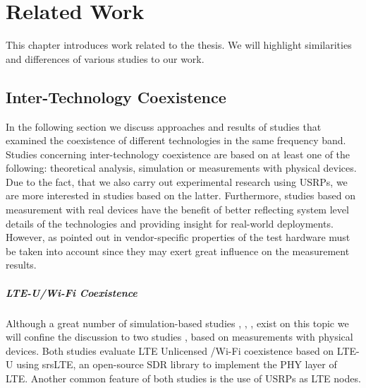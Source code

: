 \chapter{Related Work}
\label{ch:related-work}

This chapter introduces work related to the thesis. We will highlight similarities and differences of various studies to our work. 

\section{Inter-Technology Coexistence}

In the following section we discuss approaches and results of studies that examined the coexistence of different technologies in the same frequency band. Studies concerning inter-technology coexistence are based on at least one of the following: theoretical analysis, simulation or measurements with physical devices. Due to the fact, that we also carry out experimental research using USRPs, we are more interested in studies based on the latter. Furthermore, studies based on measurement with real devices have the benefit of better reflecting system level details of the technologies and providing insight for real-world deployments. However, as pointed out in \cite{gomezmiguelez16} vendor-specific properties of the test hardware must be taken into account since they may exert great influence on the measurement results. 

\paragraph{LTE-U/Wi-Fi Coexistence}
Although a great number of simulation-based studies \cite{nihtilä13}, \cite{rupasinghe14}, \cite{jeon14}, \cite{cavalcante13} exist on this topic we will confine the discussion to two studies \cite{gomezmiguelez16}, \cite{capretti16} based on measurements with physical devices. Both studies evaluate LTE Unlicensed /Wi-Fi coexistence based on LTE-U using srsLTE, an open-source SDR library to implement the PHY layer of LTE. Another common feature of both studies is the use of USRPs as LTE nodes. 

